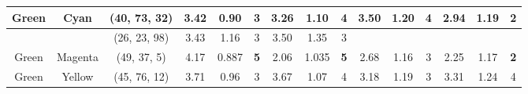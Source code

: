 \begin{table}[htbp]
{\begin{tabular}{@{}ccclcccccccccccc@{}}
    Green                   & \multicolumn{1}{c|}{Cyan}                      & \multicolumn{2}{c|}{\cellcolor[HTML]{00FF80}(40, 73, 32)}  & \multicolumn{1}{c|}{3.42} & \multicolumn{1}{c|}{0.90}  & \multicolumn{1}{c|}{3}                                  & \multicolumn{1}{c|}{3.26} & \multicolumn{1}{c|}{1.10}  & \multicolumn{1}{c|}{4}                                  & \multicolumn{1}{c|}{3.50}                   & \multicolumn{1}{c|}{1.20}                   & \multicolumn{1}{c|}{4}                                  & \multicolumn{1}{c|}{2.94}                   & \multicolumn{1}{c|}{1.19}                   & \multicolumn{1}{c|}{\cellcolor[HTML]{FD6864}\textbf{2}}                   \\ \midrule
                            & \multicolumn{1}{c|}{}                          & \multicolumn{2}{c|}{\cellcolor[HTML]{0080FF}(26, 23, 98)}  & \multicolumn{1}{c|}{3.43} & \multicolumn{1}{c|}{1.16}  & \multicolumn{1}{c|}{3}                                  & \multicolumn{1}{c|}{3.50} & \multicolumn{1}{c|}{1.35}  & \multicolumn{1}{c|}{3}                                  & \multicolumn{1}{c|}{}                       & \multicolumn{1}{c|}{}                       & \multicolumn{1}{c|}{}                                   & \multicolumn{1}{c|}{}                       & \multicolumn{1}{c|}{}                       & \multicolumn{1}{c|}{\cellcolor[HTML]{FD6864}}                             \\ \cmidrule(lr){3-10}
    \multirow{-2}{*}{Green} & \multicolumn{1}{c|}{\multirow{-2}{*}{Magenta}} & \multicolumn{2}{c|}{\cellcolor[HTML]{FF8000}(49, 37, 5)}   & \multicolumn{1}{c|}{4.17} & \multicolumn{1}{c|}{0.887} & \multicolumn{1}{c|}{\cellcolor[HTML]{32CB00}\textbf{5}} & \multicolumn{1}{c|}{2.06} & \multicolumn{1}{c|}{1.035} & \multicolumn{1}{c|}{\cellcolor[HTML]{32CB00}\textbf{5}} & \multicolumn{1}{c|}{\multirow{-2}{*}{2.68}} & \multicolumn{1}{c|}{\multirow{-2}{*}{1.16}} & \multicolumn{1}{c|}{\multirow{-2}{*}{3}}                & \multicolumn{1}{c|}{\multirow{-2}{*}{2.25}} & \multicolumn{1}{c|}{\multirow{-2}{*}{1.17}} & \multicolumn{1}{c|}{\multirow{-2}{*}{\cellcolor[HTML]{FD6864}\textbf{2}}} \\ \midrule
    Green                   & \multicolumn{1}{c|}{Yellow}                    & \multicolumn{2}{c|}{\cellcolor[HTML]{80FF00}(45, 76, 12)}  & \multicolumn{1}{c|}{3.71} & \multicolumn{1}{c|}{0.96}  & \multicolumn{1}{c|}{3}                                  & \multicolumn{1}{c|}{3.67} & \multicolumn{1}{c|}{1.07}  & \multicolumn{1}{c|}{4}                                  & \multicolumn{1}{c|}{3.18}                   & \multicolumn{1}{c|}{1.19}                   & \multicolumn{1}{c|}{3}                                  & \multicolumn{1}{c|}{3.31}                   & \multicolumn{1}{c|}{1.24}                   & \multicolumn{1}{c|}{4}                                                    \\ \midrule

\end{tabular}}
\end{table}

